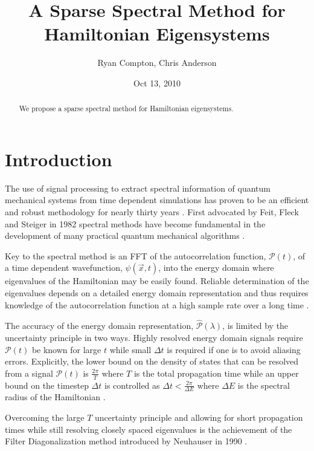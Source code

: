 \documentclass[11pt]{amsart}
\title{A Sparse Spectral Method for Hamiltonian Eigensystems}
\author{Ryan Compton, Chris Anderson}
\date{Oct 13, 2010}
\theoremstyle{remark}
\begin{document}
\begin{abstract}
We propose a sparse spectral method for Hamiltonian eigensystems.
\end{abstract}

\maketitle

\section{Introduction}

The use of signal processing to extract spectral information of quantum mechanical systems from time dependent simulations has proven to be an efficient and robust methodology for nearly thirty years \cite{Univcrsity1994}. First advocated by Feit, Fleck and Steiger in 1982 spectral methods have become fundamental in the development of many practical quantum mechanical algorithms \cite{Feit1983a}\cite{Maraner1991}.

Key to the spectral method is an FFT of the autocorrelation function, $\mathcal{P}(t)$, of a time dependent wavefunction, $\psi(\vec{x},t)$, into the energy domain where eigenvalues of the Hamiltonian may be easily found. Reliable determination of the eigenvalues depends on a detailed energy domain representation and thus requires knowledge of the autocorrelation function at a high sample rate over a long time \cite{Feit1983}.

The accuracy of the energy domain representation, $\hat{\mathcal{P}}(\lambda)$, is limited by the uncertainty principle in two ways. Highly resolved energy domain signals require $\mathcal{P}(t)$ be known for large $t$ while small $\Delta t$ is required if one is to avoid aliasing errors. Explicitly, the lower bound on the density of states that can be resolved from a signal $\mathcal{P}(t)$ is $\frac{2\pi}{T}$ where $T$ is the total propagation time while an upper bound on the timestep $\Delta t$ is controlled as $\Delta t < \frac{2\pi}{\Delta E}$ where $\Delta E$ is the spectral radius of the Hamiltonian \cite{Briggs1995}.

Overcoming the large $T$ uncertainty principle and allowing for short propagation times while still resolving closely spaced eigenvalues is the achievement of the Filter Diagonalization method introduced by Neuhauser in 1990 \cite{Wall1995} \cite{Neuhauser1994} \cite{Mandelshtam2001} \cite{Neuhauser1990}.
\end{document}
